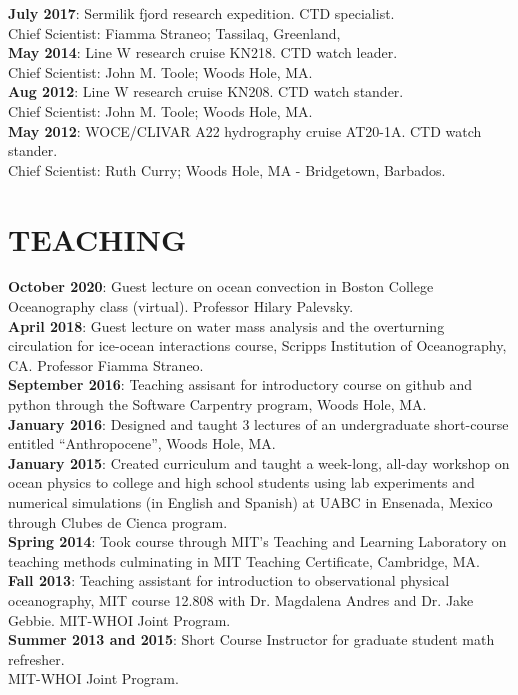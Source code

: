 \documentclass[paper=letter,fontsize=11pt]{scrartcl} %
\newcommand{\NewPart}[2]{\section*{\uppercase{#1} #2}}
\newcommand{\ShortEntry}[2]{\normalsize \noindent \textbf{#1}: #2 \\ }
\begin{document}
\ShortEntry{July 2017}{Sermilik fjord research expedition. CTD specialist.\\ Chief Scientist: Fiamma Straneo; Tassilaq, Greenland,}

\ShortEntry{May 2014}{Line W research cruise KN218. CTD watch leader.\\ Chief Scientist: John M. Toole; Woods Hole, MA.}

\ShortEntry{Aug 2012}{Line W research cruise KN208. CTD watch stander.\\ Chief Scientist: John M. Toole; Woods Hole, MA.}

\ShortEntry{May 2012}{WOCE/CLIVAR A22 hydrography cruise AT20-1A. CTD watch stander.\\ Chief Scientist: Ruth Curry; Woods Hole, MA - Bridgetown, Barbados.}


\NewPart{Teaching}{}

\ShortEntry{October 2020}{Guest lecture on ocean convection in Boston College Oceanography class (virtual). Professor Hilary Palevsky.}

\ShortEntry{April 2018}{Guest lecture on water mass analysis and the overturning circulation for ice-ocean interactions course, Scripps Institution of Oceanography, CA. Professor Fiamma Straneo.}

\ShortEntry{September 2016}{Teaching assisant for introductory course on github and python through the Software Carpentry program, Woods Hole, MA.}

\ShortEntry{January 2016}{Designed and taught 3 lectures of an undergraduate short-course entitled ``Anthropocene'', Woods Hole, MA.}

\ShortEntry{January 2015}{Created curriculum and taught a week-long, all-day workshop on ocean physics to college and high school students using lab experiments and numerical simulations (in English and Spanish) at UABC in Ensenada, Mexico through Clubes de Cienca program.}

\ShortEntry{Spring 2014}{Took course through MIT's Teaching and Learning Laboratory on teaching methods culminating in MIT Teaching Certificate, Cambridge, MA.}

\ShortEntry{Fall 2013}{Teaching assistant for introduction to observational physical oceanography, MIT course 12.808 with Dr. Magdalena Andres and Dr. Jake Gebbie. MIT-WHOI Joint Program.}

\ShortEntry{Summer 2013 and 2015}{Short Course Instructor for graduate student math refresher.\\ MIT-WHOI Joint Program.}
\end{document}
